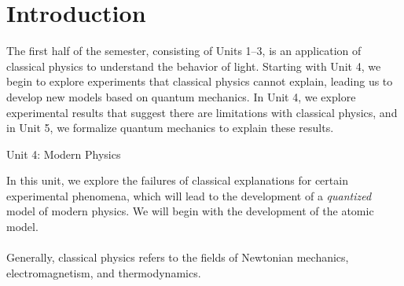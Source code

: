 \documentclass[12pt]{article}
\title{}
\date{}
\author{}
\begin{document}
\section*{Introduction}
The first half of the semester, consisting of Units 1–3, is an application of classical physics to understand the behavior of light. Starting with Unit 4, we begin to explore experiments that classical physics cannot explain, leading us to develop new models based on quantum mechanics. In Unit 4, we explore experimental results that suggest there are limitations with classical physics, and in Unit 5, we formalize quantum mechanics to explain these results.\\

{\centering\LARGE Unit 4: Modern Physics\par}\noindent
In this unit, we explore the failures of classical explanations for certain experimental phenomena, which will lead to the development of a \textit{quantized} model of modern physics. We will begin with the development of the atomic model.\\\\
Generally, classical physics refers to the fields of Newtonian mechanics, electromagnetism, and thermodynamics.
\end{document}
